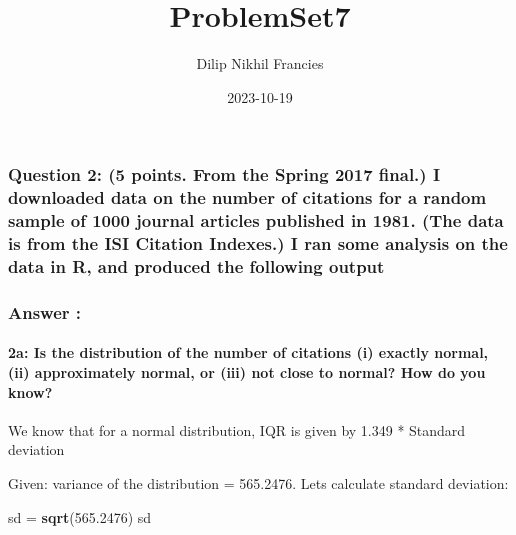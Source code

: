 \documentclass[
]{article}
\title{ProblemSet7}
\author{Dilip Nikhil Francies}
\date{2023-10-19}
\newenvironment{Shaded}{\begin{snugshade}}{\end{snugshade}}
\newcommand{\FloatTok}[1]{\textcolor[rgb]{0.00,0.00,0.81}{#1}}
\newcommand{\FunctionTok}[1]{\textcolor[rgb]{0.13,0.29,0.53}{\textbf{#1}}}
\newcommand{\NormalTok}[1]{#1}
\newcommand{\OtherTok}[1]{\textcolor[rgb]{0.56,0.35,0.01}{#1}}
\begin{document}
\maketitle

\hypertarget{question-2-5-points.-from-the-spring-2017-final.-i-downloaded-data-on-the-number-of-citations-for-a-random-sample-of-1000-journal-articles-published-in-1981.-the-data-is-from-the-isi-citation-indexes.-i-ran-some-analysis-on-the-data-in-r-and-produced-the-following-output}{%
\subsubsection{Question 2: (5 points. From the Spring 2017 final.) I
downloaded data on the number of citations for a random sample of 1000
journal articles published in 1981. (The data is from the ISI Citation
Indexes.) I ran some analysis on the data in R, and produced the
following
output}\label{question-2-5-points.-from-the-spring-2017-final.-i-downloaded-data-on-the-number-of-citations-for-a-random-sample-of-1000-journal-articles-published-in-1981.-the-data-is-from-the-isi-citation-indexes.-i-ran-some-analysis-on-the-data-in-r-and-produced-the-following-output}}

\hypertarget{answer}{%
\subsubsection{Answer :}\label{answer}}

\hypertarget{a-is-the-distribution-of-the-number-of-citations-i-exactly-normal-ii-approximately-normal-or-iii-not-close-to-normal-how-do-you-know}{%
\paragraph{2a: Is the distribution of the number of citations (i)
exactly normal, (ii) approximately normal, or (iii) not close to normal?
How do you
know?}\label{a-is-the-distribution-of-the-number-of-citations-i-exactly-normal-ii-approximately-normal-or-iii-not-close-to-normal-how-do-you-know}}

We know that for a normal distribution, IQR is given by 1.349 * Standard
deviation

Given: variance of the distribution = 565.2476. Lets calculate standard
deviation:

\begin{Shaded}
\begin{Highlighting}[]
\NormalTok{sd }\OtherTok{=} \FunctionTok{sqrt}\NormalTok{(}\FloatTok{565.2476}\NormalTok{)}
\NormalTok{sd}
\end{Highlighting}
\end{Shaded}
\end{document}
